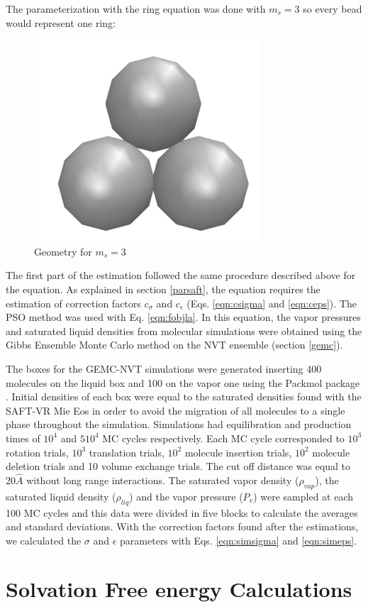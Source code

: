 The parameterization with the  ring equation was done with $m_{s}=3$ so every bead would represent one ring:

\begin{figure}[th]
	\centering
	\includegraphics[width=0.15\linewidth]{Figures/fe3}
	\caption{Geometry for $m_{s}=3$}
	\label{fig:fen3}
\end{figure}

The first part of the estimation followed the same procedure described above for the  equation. As explained in section \ref{parsaft}, the  equation requires the estimation of correction factors $c_{\sigma}$ and $c_{\epsilon}$ (Eqs. \eqref{eqn:csigma} and \eqref{eqn:ceps}). The PSO method was used with Eq. \eqref{eqn:fobjla}. In this equation, the vapor pressures and saturated liquid densities from molecular simulations were obtained using the Gibbs Ensemble Monte Carlo method on the NVT ensemble  (section \ref{gemc}).

The boxes for the GEMC-NVT simulations were generated inserting 400 molecules on the liquid box and 100 on the vapor one using the Packmol package \cite{packmol}. Initial densities of each box were equal to the saturated densities found with the SAFT-VR Mie Eos in order to avoid the migration of all molecules to a single phase throughout the simulation.  Simulations had equilibration and production times of $10^{4}$ and $5 10^{4}$ MC cycles respectively. Each MC cycle corresponded to $10^3$ rotation trials, $10^3$ translation trials, $10^2$ molecule insertion trials, $10^2$ molecule deletion trials and 10 volume exchange trials. The cut off distance was equal to $20 \hat{A}$ without long range interactions. The saturated vapor density ($\rho_{vap}$), the saturated liquid density ($\rho_{liq}$) and the vapor pressure ($P_{v}$) were sampled at each 100 MC cycles and this data were divided in five blocks to calculate the averages and standard deviations. With the correction factors found after the estimations, we calculated the $\sigma$ and $\epsilon$ parameters with Eqs. \eqref{eqn:simsigma} and \eqref{eqn:simeps}.


\section{Solvation Free energy Calculations}\label{solvme}

